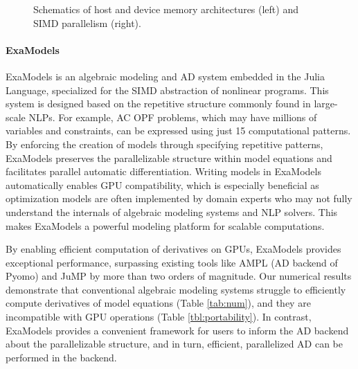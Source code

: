 \begin{figure}[t]
{
  }
  \label{fig:simd}
  \caption{Schematics of host and device memory architectures (left) and SIMD parallelism (right).}\label{fig:memory}
\end{figure}


\paragraph{ExaModels}

ExaModels is an algebraic modeling and AD system embedded in the Julia
Language, specialized for the SIMD abstraction of nonlinear
programs. This system is designed based on the repetitive structure
commonly found in large-scale NLPs. For example, AC OPF problems,
which may have millions of variables and constraints, can be expressed
using just 15 computational patterns. By enforcing the creation of
models through specifying repetitive patterns, ExaModels preserves the
parallelizable structure within model equations and facilitates
parallel automatic differentiation. Writing models in ExaModels
automatically enables GPU compatibility, which is especially
beneficial as optimization models are often implemented by domain
experts who may not fully understand the internals of algebraic
modeling systems and NLP solvers.  This makes ExaModels a powerful
modeling platform for scalable computations.


By enabling efficient computation of derivatives on GPUs, ExaModels
provides exceptional performance, surpassing existing tools like AMPL
(AD backend of Pyomo) and JuMP by more than two orders of
magnitude. Our numerical results demonstrate that conventional
algebraic modeling systems struggle to efficiently compute derivatives
of model equations (Table \ref{tab:num}), and they are incompatible
with GPU operations (Table \ref{tbl:portability}). In contrast,
ExaModels provides a convenient framework for users to inform the AD
backend about the parallelizable structure, and in turn, efficient,
parallelized AD can be performed in the backend.


